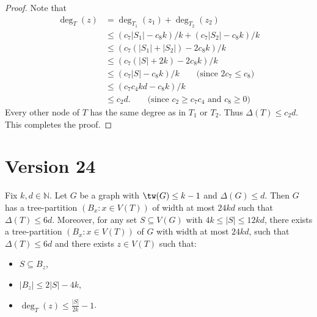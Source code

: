 \begin{proof}
Note that 
\begin{align*}
 \deg_T(z)  & = \deg_{T_1}(z_1) + \deg_{T_2}(z_2)\\
    & \leq  (c_7|S_1|-c_8k)/k + (c_7|S_2|-c_8k)/k\\
    & \leq  (c_7(|S_1|+|S_2|)-2c_8k)/k\\
    & \leq  (c_7(|S|+2k)-2c_8k)/k\\
    & \leq  (c_7|S|-c_8k)/k \qquad \text{(since $2c_7  \leq  c_8$)}\\
    & \leq  (c_7c_4kd-c_8k)/k \\
    & \leq  c_2 d. \qquad \text{(since $c_2 \geq c_7c_4$ and $c_8 \geq 0$)}
\end{align*}
Every other node of $T$ has the same degree as in $T_1$ or $T_2$. 
Thus $\Delta(T) \leq c_2d$. This completes the proof.
\end{proof}


\section{Version 24}

\begin{lem}
Fix $k,d\in\mathbb{N}$. 
Let $G$ be a graph with $\tw(G)\leq k-1$ and $\Delta(G)\leq d$.
Then $G$ has a tree-partition $(B_x:x\in V(T))$ of width at most $24kd$ such that $\Delta(T)\leq 6 d$. 
Moreover, for any set $S\subseteq V(G)$ with $4 k\leq|S| \leq 12 kd$, there exists a tree-partition $(B_x:x\in V(T))$ of $G$ with width at most $24 kd$, such that $\Delta(T)\leq 6d$ and there exists $z\in V(T)$ such that:
\begin{itemize}
    \item $S\subseteq B_z$, 
    \item $|B_z|\leq 2|S|-4k$,
    \item $\deg_T(z)\leq \frac{|S|}{2k} - 1$.
\end{itemize}
\end{lem}

